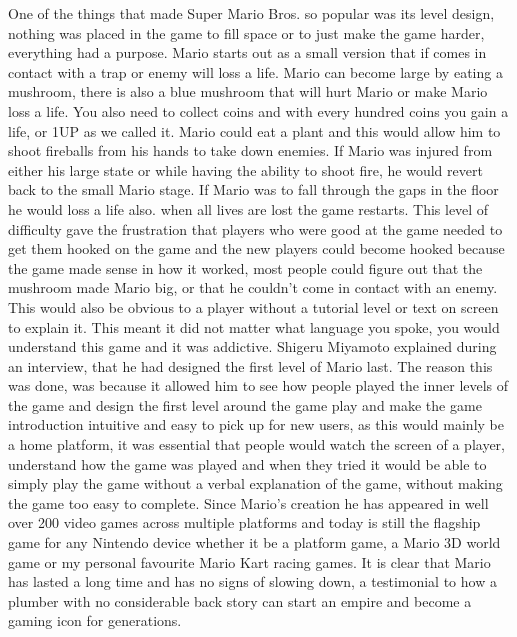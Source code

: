 \documentclass{article}
\begin{document}
One of the things that made Super Mario Bros. so popular was its level design, nothing was placed in the game to fill space or to just make the game harder, everything had a purpose. Mario starts out as a small version that if comes in contact with a trap or enemy will loss a life. Mario can become large by eating a mushroom, there is also a blue mushroom that will hurt Mario or make Mario loss a life. You also need to collect coins and with every hundred coins you gain a life, or 1UP as we called it.  Mario could eat a plant and this would allow him to shoot fireballs from his hands to take down enemies. If Mario was injured from either his large state or while having the ability to shoot fire, he would revert back to the small Mario stage. If Mario was to fall through the gaps in the floor he would loss a life also. when all lives are lost the game restarts. This level of difficulty gave the frustration that players who were good at the game needed to get them hooked on the game and the new players could become hooked because the game made sense in how it worked, most people could figure out that the mushroom made   Mario big, or that he couldn't come in contact with an enemy. This would also be obvious to a player without a tutorial level or text on screen to explain it. This meant it did not matter what language you spoke, you would understand this game and it was addictive. \newline 
Shigeru Miyamoto explained during an interview, that he had designed the first level of Mario last. The reason this was done, was because it allowed him to see how people played the inner levels of the game and design the first level around the game play and make the game introduction intuitive and easy to pick up for new users, as this would mainly be a home platform, it was essential that people would watch the screen of a player, understand how the game was played and when they tried it would be able to simply play the game without a verbal explanation of the game, without making the game too easy to complete.  \newline 
Since Mario's creation he has appeared in well over 200 video games across multiple platforms and today is still the flagship game for any Nintendo device whether it be a platform game, a Mario 3D world game or my personal favourite Mario Kart racing games. It is clear that Mario has lasted a long time and has no signs of slowing down, a testimonial to how a plumber with no considerable back story can start an empire and become a gaming icon for generations.
\clearpage		
\end{document}
